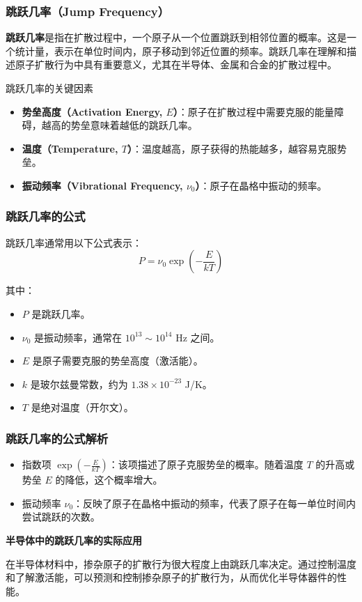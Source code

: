 \documentclass[xcolor=table,dvipsnames,svgnames,aspectratio=169]{ctexbeamer}
\begin{document}
\begin{frame}
  \frametitle{ 跳跃几率（Jump Frequency）}

\textbf{跳跃几率}是指在扩散过程中，一个原子从一个位置跳跃到相邻位置的概率。这是一个统计量，表示在单位时间内，原子移动到邻近位置的频率。跳跃几率在理解和描述原子扩散行为中具有重要意义，尤其在半导体、金属和合金的扩散过程中。

跳跃几率的关键因素

\begin{itemize}
  \item \textbf{势垒高度（Activation Energy, \( E \)）}：原子在扩散过程中需要克服的能量障碍，越高的势垒意味着越低的跳跃几率。
  \item \textbf{温度（Temperature, \( T \)）}：温度越高，原子获得的热能越多，越容易克服势垒。
  \item \textbf{振动频率（Vibrational Frequency, \( \nu_0 \)）}：原子在晶格中振动的频率。
\end{itemize}
\end{frame}

\begin{frame}
  \frametitle{跳跃几率的公式}

  跳跃几率通常用以下公式表示：
  \[ P = \nu_0 \exp\left(-\frac{E}{kT}\right) \]

其中：

\begin{itemize}
  \item \( P \) 是跳跃几率。
  \item \( \nu_0 \) 是振动频率，通常在 \( 10^{13} \sim 10^{14} \) Hz 之间。
  \item \( E \) 是原子需要克服的势垒高度（激活能）。
  \item \( k \) 是玻尔兹曼常数，约为 \( 1.38 \times 10^{-23} \) J/K。
  \item \( T \) 是绝对温度（开尔文）。
\end{itemize}
\end{frame}

\begin{frame}
  \frametitle{跳跃几率的公式解析}

\begin{itemize}
  \item 指数项 \(\exp\left(-\frac{E}{kT}\right)\)：该项描述了原子克服势垒的概率。随着温度 \( T \) 的升高或势垒 \( E \) 的降低，这个概率增大。
  \item 振动频率 \(\nu_0\)：反映了原子在晶格中振动的频率，代表了原子在每一单位时间内尝试跳跃的次数。
\end{itemize}

\textbf{半导体中的跳跃几率的实际应用}

在半导体材料中，掺杂原子的扩散行为很大程度上由跳跃几率决定。通过控制温度和了解激活能，可以预测和控制掺杂原子的扩散行为，从而优化半导体器件的性能。
\end{frame}
\end{document}

